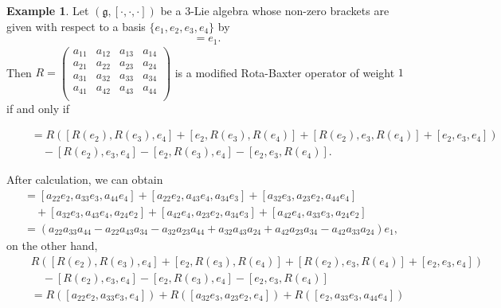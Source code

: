 \documentclass[12pt]{amsart}
\theoremstyle{definition}
\newtheorem{exam}[theorem]{Example}
\begin{document}
\begin{exam}
Let $(\mathfrak{g}, [\cdot, \cdot, \cdot])$ be a $3$-Lie algebra whose non-zero brackets are given with
 respect to a basis $\{e_1, e_2, e_3, e_4\}$ by
\begin{align*}
[e_2, e_3, e_4]=e_1.
\end{align*}
Then $R=\left(
                                            \begin{array}{cccc}
                                             a_{11}  & a_{12} & a_{13}& a_{14}\\
                                             a_{21}& a_{22}& a_{23}& a_{24}\\
                                             a_{31}& a_{32}& a_{33}& a_{34}\\
                                             a_{41}& a_{42}& a_{43}& a_{44}\\
                                            \end{array}
                                          \right)$ is a modified Rota-Baxter operator of weight $1$ if and only if
\begin{small}
\begin{align*}
[R(e_2), R(e_3), R(e_4)] &=R( [R(e_2), R(e_3), e_4]+[e_2, R(e_3), R(e_4)]+[R(e_2), e_3, R(e_4)]+[e_2, e_3, e_4])\\
\quad &\quad- [R(e_2), e_3, e_4]-[e_2, R(e_3), e_4]-[e_2, e_3, R(e_4)].
\end{align*}
\end{small}
After calculation, we can obtain
\begin{align*}
[R(e_2), R(e_3), R(e_4)]&=[a_{22}e_2, a_{33} e_3, a_{44}e_4]+[a_{22}e_2, a_{43} e_4, a_{34}e_3]+[a_{32}e_3, a_{23} e_2, a_{44}e_4]\\
&\quad + [a_{32}e_3, a_{43} e_4, a_{24}e_2]+[a_{42}e_4, a_{23} e_2, a_{34}e_3]+[a_{42}e_4, a_{33} e_3, a_{24}e_2]\\
&=(a_{22}a_{33}a_{44}-a_{22}a_{43}a_{34}-a_{32}a_{23}a_{44}+a_{32}a_{43}a_{24}+a_{42}a_{23}a_{34}-a_{42}a_{33}a_{24})e_1,
\end{align*}
on the other hand,
\begin{align*}
&R( [R(e_2), R(e_3), e_4]+[e_2, R(e_3), R(e_4)]+[R(e_2), e_3, R(e_4)]+[e_2, e_3, e_4])\\
\quad &\quad- [R(e_2), e_3, e_4]-[e_2, R(e_3), e_4]-[e_2, e_3, R(e_4)]\\
&=R([a_{22}e_2, a_{33}e_3, e_4]) +R([a_{32}e_3,a_{23}e_2, e_4])+ R([e_2, a_{33}e_3, a_{44}e_4])\\

\end{align*}
\end{exam}
\end{document}
